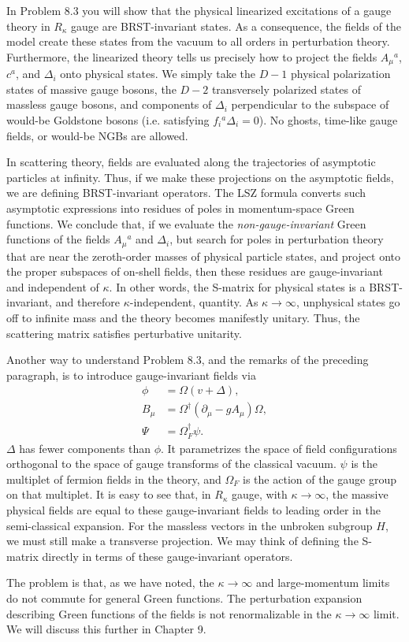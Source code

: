 In Problem 8.3 you will show that the physical linearized excitations of a
gauge theory in $R_\kappa$ gauge are BRST-invariant states. As a consequence,
the fields of the model create these states from the vacuum to all orders in
perturbation theory. Furthermore, the linearized theory tells us precisely how
to project the fields $A_\mu{}^a$, $c^a$, and $\Delta_i$ onto physical states. We
simply take the $D-1$ physical polarization states of massive gauge bosons,
the $D-2$ transversely polarized states of massless gauge bosons, and components of
$\Delta_i$ perpendicular to the subspace of would-be Goldstone bosons (i.e.
satisfying $f_i{}^a\Delta_i=0$). No ghosts, time-like gauge fields, or would-be
NGBs are allowed.

In scattering theory, fields are evaluated along the trajectories of
asymptotic particles at infinity. Thus, if we make these projections on the
asymptotic fields, we are defining BRST-invariant operators. The LSZ formula
converts such asymptotic expressions into residues of poles in momentum-space
Green functions. We conclude that, if we evaluate the \emph{non-gauge-invariant}
Green functions of the fields $A_\mu{}^a$ and $\Delta_i$, but search for poles in
perturbation theory that are near the zeroth-order masses of physical particle
states, and project onto the proper subspaces of on-shell fields, then these
residues are gauge-invariant and independent of $\kappa$. In other words, the
S-matrix for physical states is a BRST-invariant, and therefore
$\kappa$-independent, quantity. As $\kappa\to\infty$, unphysical states go
off to infinite mass and the theory becomes manifestly unitary. Thus, the
scattering matrix satisfies perturbative unitarity.

Another way to understand Problem 8.3, and the remarks of the preceding
paragraph, is to introduce gauge-invariant fields via
\[
\begin{aligned}
  \phi&=\Omega(v+\Delta),\\
  B_\mu&=\Omega^\dagger(\partial_\mu-gA_\mu)\Omega,\\
  \Psi&=\Omega_F^\dagger\psi .
\end{aligned}
\]
$\Delta$ has fewer components than $\phi$. It parametrizes the space of field
configurations orthogonal to the space of gauge transforms of the classical
vacuum. $\psi$ is the multiplet of fermion fields in the theory, and
$\Omega_F$ is the action of the gauge group on that multiplet. It is easy to
see that, in $R_\kappa$ gauge, with $\kappa\to\infty$, the massive physical
fields are equal to these gauge-invariant fields to leading order in the
semi-classical expansion. For the massless vectors in the unbroken subgroup
$H$, we must still make a transverse projection. We may think of defining the
S-matrix directly in terms of these gauge-invariant operators.


The problem is that, as we have noted, the $\kappa\to\infty$ and
large-momentum limits do not commute for general Green functions. The
perturbation expansion describing Green functions of the fields is not
renormalizable in the $\kappa\to\infty$ limit. We will discuss this further
in Chapter 9.
